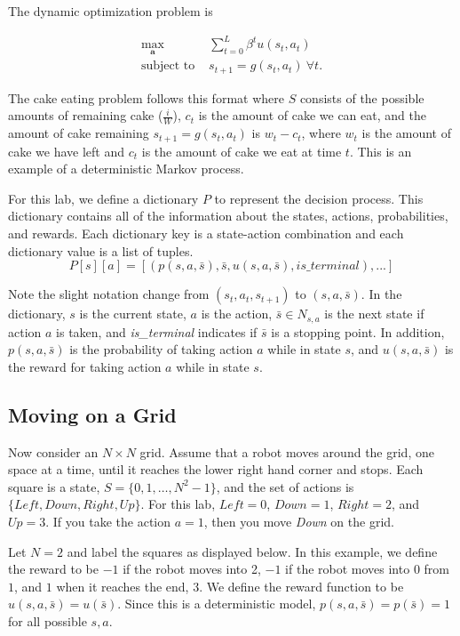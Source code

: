 The dynamic optimization problem is

\begin{align}
\label{eq:policyiter-dynopt1}
\max_\mathbf{a}  & \sum_{t=0}^{L} \beta^t u(s_t,a_t) \\
\mbox{subject to } & s_{t+1}= g(s_t,a_t)\ \forall t.
\end{align}

The cake eating problem follows this format where $S$ consists of the possible amounts of remaining cake ($\frac{i}{W}$), $c_t$ is the amount of cake we can eat, and the amount of cake remaining $s_{t+1}=g(s_t,a_t)$ is $w_t-c_t$, where $w_t$ is the amount of cake we have left and $c_t$ is the amount of cake we eat at time $t$.
This is an example of a deterministic Markov process.

For this lab, we define a dictionary $P$ to represent the decision process.
This dictionary contains all of the information about the states, actions, probabilities, and rewards.
Each dictionary key is a state-action combination and each dictionary value is a list of tuples.
\[P[s][a]=[(p(s,a,\bar{s}), \bar{s}, u(s,a,\bar{s}), is\_terminal),...]\]

Note the slight notation change from $(s_t,a_t,s_{t+1})$ to $(s,a,\bar{s})$. In the dictionary, $s$ is the current state, $a$ is the action, $\bar{s}\in N_{s,a}$ is the next state if action $a$ is taken, and \emph{is\_terminal} indicates if $\bar{s}$ is a stopping point.
In addition, $p(s,a,\bar{s}) $ is the probability of taking action $a$ while in state $s$, and $u(s,a,\bar{s})$ is the reward for taking action $a$ while in state $s$.

\subsection*{Moving on a Grid}

Now consider an $N \times N$ grid.
Assume that a robot moves around the grid, one space at a time, until it reaches the lower right hand corner and stops.
Each square is a state, $S = \{0, 1, \ldots, N^2-1\}$, and the set of actions is $\{Left, Down, Right, Up\}$.
For this lab, $Left = 0$, $Down = 1$, $Right = 2$, and $Up = 3$.
If you take the action $a = 1$, then you move \emph{Down} on the grid.

Let $N=2$ and label the squares as displayed below.
In this example, we define the reward to be $-1$ if the robot moves into 2, $-1$ if the robot moves into $0$ from $1$, and $1$ when it reaches the end, $3$.
We define the reward function to be $u(s,a,\bar{s}) = u(\bar{s})$.
Since this is a deterministic model, $p(s,a,\bar{s}) = p(\bar{s}) = 1$ for all possible $s,a$.

